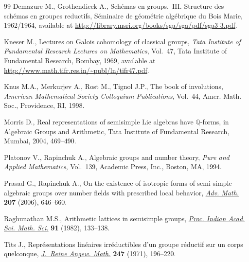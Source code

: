 \documentclass[11pt]{article}
\numberwithin{equation}{section}
\begin{document}
\begin{thebibliography}{99}
Demazure M., Grothendieck A., Sch\'emas en groups.~III. Structure des sch\'emas
  en groupes reductifs, S\'eminaire de g\'eom\'etrie alg\'ebrique du {B}ois
  {M}arie, 1962/1964, available at
  \url{http://library.msri.org/books/sga/sga/pdf/sga3-3.pdf}.

Kneser M., Lectures on {G}alois cohomology of classical groups, \textit{Tata
  Institute of Fundamental Research Lectures on Mathematics}, Vol.~47, Tata
  Institute of Fundamental Research, Bombay, 1969, available at
  \url{http://www.math.tifr.res.in/~publ/ln/tifr47.pdf}.

Knus M.A., Merkurjev A., Rost M., Tignol J.P., The book of involutions,
  \textit{American Mathematical Society Colloquium Publications}, Vol.~44,
  Amer. Math. Soc., Providence, RI, 1998.

Morris D., Real representations of semisimple {L}ie algebras have {${\mathbb
  Q}$}-forms, in Algebraic Groups and Arithmetic, Tata Institute of Fundamental
  Research, Mumbai, 2004, 469--490.

Platonov V., Rapinchuk A., Algebraic groups and number theory, \textit{Pure and
  Applied Mathematics}, Vol.~139, Academic Press, Inc., Boston, MA, 1994.

Prasad G., Rapinchuk A., On the existence of isotropic forms of semi-simple
  algebraic groups over number f\/ields with prescribed local behavior,
  \href{http://dx.doi.org/10.1016/j.aim.2006.01.001}{\textit{Adv. Math.}} \textbf{207} (2006), 646--660.

Raghunathan M.S., Arithmetic lattices in semisimple groups, \href{http://dx.doi.org/10.1007/BF02967980}{\textit{Proc.
  Indian Acad. Sci. Math. Sci.}} \textbf{91} (1982), 133--138.

Tits J., Repr\'esentations lin\'eaires irr\'eductibles d'un groupe r\'eductif
  sur un corps quelconque, \href{http://dx.doi.org/10.1515/crll.1971.247.196}{\textit{J.~Reine Angew. Math.}} \textbf{247} (1971),
  196--220.

\end{thebibliography}
\end{document}
